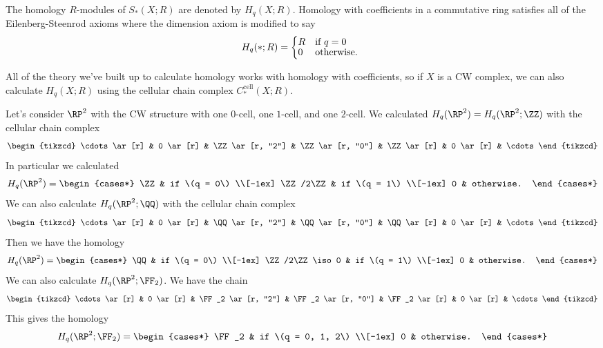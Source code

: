 \documentclass{standalone}
\begin{document}
The homology \(R\)-modules of \(S_*(X; R)\) are denoted by \(H_q(X; R)\).
Homology with coefficients in a commutative ring satisfies all of
the Eilenberg-Steenrod axioms where the dimension axiom is modified to say
\[
  H_q(*; R) = \begin{cases*}
    R & if \(q = 0\) \\[-1ex]
    0 & otherwise.
  \end{cases*}
\]

All of the theory we've built up to calculate homology works with
homology with coefficients, so if \(X\) is a CW complex,
we can also calculate \(H_q(X; R)\) using the cellular chain complex
\(C^{\text{cell}}_*(X; R)\).

\begin{example}
  Let's consider \(\RP^2\) with the CW structure with
    one \(0\)-cell,
    one \(1\)-cell, and
    one \(2\)-cell.
  We calculated \(H_q(\RP^2) = H_q(\RP^2; \ZZ)\) with the
  cellular chain complex
  \[
    \begin{tikzcd}
      \cdots \ar[r] &
      0 \ar[r] &
      \ZZ \ar[r, "2"] &
      \ZZ \ar[r, "0"] &
      \ZZ \ar[r] &
      0 \ar[r] &
      \cdots
    \end{tikzcd}
  \]
  In particular we calculated
  \[
    H_q(\RP^2) = \begin{cases*}
      \ZZ & if \(q = 0\) \\[-1ex]
      \ZZ/2\ZZ & if \(q = 1\) \\[-1ex] %
      0 & otherwise.
    \end{cases*}
  \]
  We can also calculate \(H_q(\RP^2; \QQ)\) with the cellular chain complex
  \[
    \begin{tikzcd}
      \cdots \ar[r] &
      0 \ar[r] &
      \QQ \ar[r, "2"] &
      \QQ \ar[r, "0"] &
      \QQ \ar[r] &
      0 \ar[r] &
      \cdots
    \end{tikzcd}
  \]
  Then we have the homology
  \[
    H_q(\RP^2) = \begin{cases*}
      \QQ & if \(q = 0\) \\[-1ex]
      \ZZ/2\ZZ \iso 0 & if \(q = 1\) \\[-1ex] %
      0 & otherwise.
    \end{cases*}
  \]
  We can also calculate \(H_q(\RP^2; \FF_2)\). We have the chain
  \[
    \begin{tikzcd}
      \cdots \ar[r] &
      0 \ar[r] &
      \FF_2 \ar[r, "2"] &
      \FF_2 \ar[r, "0"] &
      \FF_2 \ar[r] &
      0 \ar[r] &
      \cdots
    \end{tikzcd}
  \]
  This gives the homology
  \[
    H_q(\RP^2; \FF_2) = \begin{cases*}
      \FF_2 & if \(q = 0, 1, 2\) \\[-1ex]
      0 & otherwise.
    \end{cases*}
  \]
\end{example}
\end{document}

